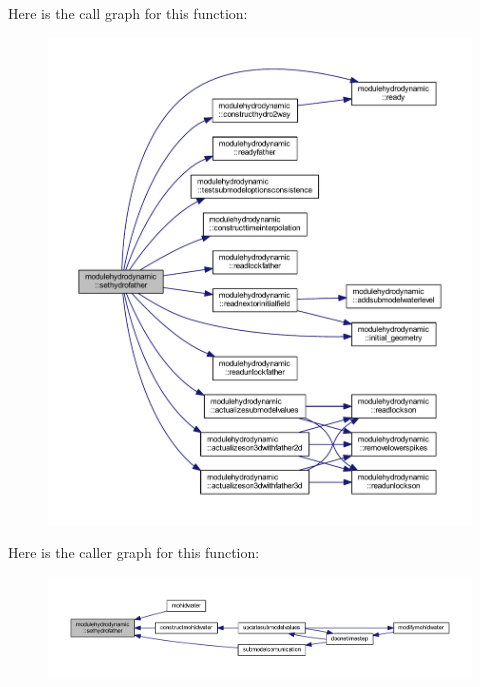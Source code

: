 Here is the call graph for this function\+:\nopagebreak
\begin{figure}[H]
\begin{center}
\leavevmode
\includegraphics[width=350pt]{namespacemodulehydrodynamic_abc9bf4137583800ad278abc052b5de37_cgraph}
\end{center}
\end{figure}
Here is the caller graph for this function\+:\nopagebreak
\begin{figure}[H]
\begin{center}
\leavevmode
\includegraphics[width=350pt]{namespacemodulehydrodynamic_abc9bf4137583800ad278abc052b5de37_icgraph}
\end{center}
\end{figure}
\mbox{\label{namespacemodulehydrodynamic_a429223ac8f920fd2b743524bf353e8c1}} 
